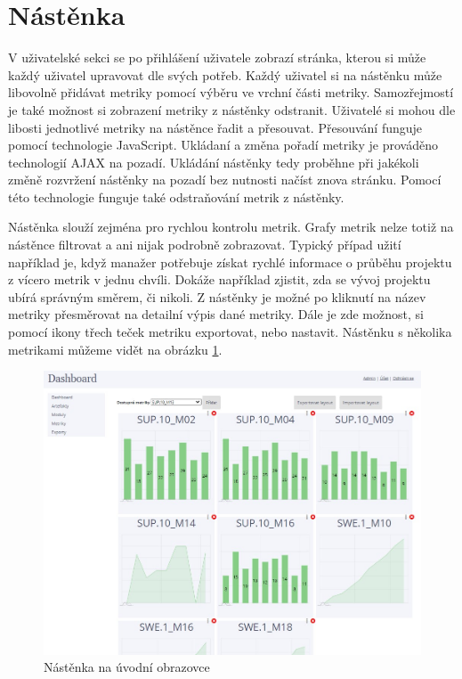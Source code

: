 \documentclass[czech,master]{diploma}
\begin{document}
\section{Nástěnka}
V uživatelské sekci se po přihlášení uživatele zobrazí stránka, kterou si může každý uživatel upravovat dle svých potřeb. Každý uživatel si na nástěnku může libovolně přidávat metriky pomocí výběru ve vrchní části metriky. Samozřejmostí je také možnost si zobrazení metriky z nástěnky odstranit. Uživatelé si mohou dle libosti jednotlivé metriky na nástěnce řadit a přesouvat. Přesouvání funguje pomocí technologie JavaScript. Ukládaní a změna pořadí metriky je prováděno technologií AJAX na pozadí. Ukládání nástěnky tedy proběhne při jakékoli změně rozvržení nástěnky na pozadí bez nutnosti načíst znova stránku. Pomocí této technologie funguje také odstraňování metrik z nástěnky.

Nástěnka slouží zejména pro rychlou kontrolu metrik. Grafy metrik nelze totiž na nástěnce filtrovat a ani nijak podrobně zobrazovat. Typický případ užití například je, když manažer potřebuje získat rychlé informace o průběhu projektu z vícero metrik v jednu chvíli. Dokáže například zjistit, zda se vývoj projektu ubírá správným směrem, či nikoli. Z nástěnky je možné po kliknutí na název metriky přesměrovat na detailní výpis dané metriky. Dále je zde možnost, si pomocí ikony třech teček metriku exportovat, nebo nastavit. Nástěnku s několika metrikami můžeme vidět na obrázku \ref{fig:dashboard_metrics}.

\begin{figure}[!ht]
    \centering
    \includegraphics[width=1\textwidth]{Diplomka/Figures/dashboard_metrics.jpg}
    \caption{Nástěnka na úvodní obrazovce}
    \label{fig:dashboard_metrics}
\end{figure}
\end{document}
